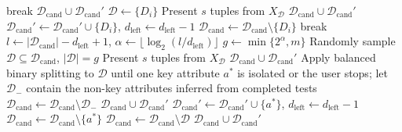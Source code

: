 \documentclass[conference]{IEEEtran}
\theoremstyle{definition}
\theoremstyle{plain}
\begin{document}
\begin{algorithm}[!t]
\begin{algorithmic}[1]
     break
    \EndIf
     
                \State \Return $\mathcal{D}_\text{cand}\cup\mathcal{D}_\text{cand}'$
            \EndIf
            \State $\mathcal{D} \gets \{D_i\}$
            \State Present $s$ tuples from $X_\mathcal{D}$
                \State \Return $\mathcal{D}_\text{cand}\cup\mathcal{D}_\text{cand}'$
            \EndIf
                \State $\mathcal{D}_\text{cand}' \gets \mathcal{D}_\text{cand}' \cup \{D_i\}$, $d_\text{left} \gets d_\text{left} - 1$
            \EndIf
            \State $\mathcal{D}_\text{cand} \gets \mathcal{D}_\text{cand} \setminus \{D_i\}$
             break
            \EndIf
        \EndFor
    \Else {}
        \State $l \gets |\mathcal{D}_\text{cand}| - d_\text{left} + 1$, $\alpha \gets \lfloor \log_2(l/d_\text{left}) \rfloor$
        \State $g \gets \min\{2^\alpha,m\}$
        \State Randomly sample $\mathcal{D} \subseteq \mathcal{D}_\text{cand}$, $|\mathcal{D}| = g$
        \State Present $s$ tuples from $X_\mathcal{D}$
            \State \Return $\mathcal{D}_\text{cand}\cup\mathcal{D}_\text{cand}'$
        \EndIf
            \State Apply balanced binary splitting to $\mathcal{D}$ until one key attribute $a^*$ is isolated or the user stops; let $\mathcal{D}_{-}$ contain the non-key attributes inferred from completed tests
            \State $\mathcal{D}_\text{cand}\gets\mathcal{D}_\text{cand}\setminus\mathcal{D}_{-}$
                \State \Return $\mathcal{D}_\text{cand}\cup\mathcal{D}_\text{cand}'$
            \EndIf
            \State $\mathcal{D}_\text{cand}' \gets \mathcal{D}_\text{cand}' \cup \{a^*\}$, $d_\text{left} \gets d_\text{left} - 1$
            \State $\mathcal{D}_\text{cand} \gets \mathcal{D}_\text{cand} \setminus \{a^*\}$
        \Else
            \State $\mathcal{D}_\text{cand} \gets \mathcal{D}_\text{cand} \setminus \mathcal{D}$
        \EndIf
    \EndIf
\EndWhile
\State \Return $\mathcal{D}_\text{cand}\cup \mathcal{D}_\text{cand}'$
\end{algorithmic}
\end{algorithm}
\end{document}
